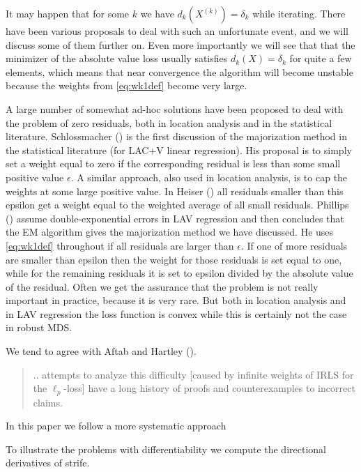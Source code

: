 \documentclass[
  12pt,
  letterpaper,
  DIV=11,
  numbers=noendperiod]{scrartcl}
\begin{document}
It may happen that for some \(k\) we have \(d_k(X^{(k)})=\delta_k\)
while iterating. There have been various proposals to deal with such an
unfortunate event, and we will discuss some of them further on. Even
more importantly we will see that that the minimizer of the absolute
value loss usually satisfies \(d_k(X)=\delta_k\) for quite a few
elements, which means that near convergence the algorithm will become
unstable because the weights from \eqref{eq:wk1def} become very large.

A large number of somewhat ad-hoc solutions have been proposed to deal
with the problem of zero residuals, both in location analysis and in the
statistical literature. Schlossmacher
() is the first discussion of the
majorization method in the statistical literature (for LAC+V linear
regression). His proposal is to simply set a weight equal to zero if the
corresponding residual is less than some small positive value
\(\epsilon\). A similar approach, also used in location analysis, is to
cap the weights at some large positive value. In Heiser
() all residuals smaller than this epsilon
get a weight equal to the weighted average of all small residuals.
Phillips () assume double-exponential
errors in LAV regression and then concludes that the EM algorithm gives
the majorization method we have discussed. He uses \eqref{eq:wk1def}
throughout if all residuals are larger than \(\epsilon\). If one of more
residuals are smaller than epsilon then the weight for those residuals
is set equal to one, while for the remaining residuals it is set to
epsilon divided by the absolute value of the residual. Often we get the
assurance that the problem is not really important in practice, because
it is very rare. But both in location analysis and in LAV regression the
loss function is convex while this is certainly not the case in robust
MDS.

We tend to agree with Aftab and Hartley
().

\begin{quote}
.. attempts to analyze this difficulty {[}caused by infinite weights of
IRLS for the \(\ell_p\)-loss{]} have a long history of proofs and
counterexamples to incorrect claims.
\end{quote}

In this paper we follow a more systematic approach

To illustrate the problems with differentiability we compute the
directional derivatives of strife.
\end{document}
